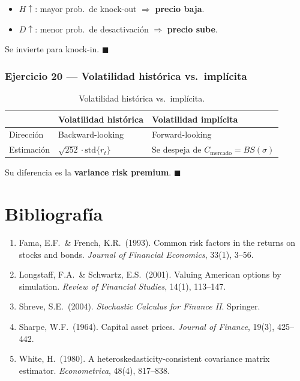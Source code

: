 \documentclass[12pt,letterpaper]{article}
\begin{document}
\begin{itemize}
  \item $H\uparrow$: mayor prob.\ de knock-out $\Rightarrow$ \textbf{precio baja}.
  \item $D\uparrow$: menor prob.\ de desactivaci\'on $\Rightarrow$ \textbf{precio sube}.
\end{itemize}
Se invierte para knock-in. $\blacksquare$

\section*{Ejercicio 20 --- Volatilidad hist\'orica vs.\ impl\'icita}

\begin{table}[h!]
\centering
\begin{tabular}{@{}lll@{}}
\toprule
 & Volatilidad hist\'orica & Volatilidad impl\'icita \\
\midrule
Direcci\'on  & Backward-looking & Forward-looking \\
Estimaci\'on & $\sqrt{252}\cdot\mathrm{std}\{r_t\}$
             & Se despeja de $C_{\text{mercado}} = BS(\sigma)$ \\
\bottomrule
\end{tabular}
\caption{Volatilidad hist\'orica vs.\ impl\'icita.}
\end{table}

Su diferencia es la \textbf{variance risk premium}. $\blacksquare$

\part*{Bibliograf\'ia}

\begin{enumerate}
  \item Fama, E.F.\ \& French, K.R.\ (1993). Common risk factors in the returns
    on stocks and bonds. \textit{Journal of Financial Economics}, 33(1), 3--56.
  \item Longstaff, F.A.\ \& Schwartz, E.S.\ (2001). Valuing American options by
    simulation. \textit{Review of Financial Studies}, 14(1), 113--147.
  \item Shreve, S.E.\ (2004). \textit{Stochastic Calculus for Finance II}.
    Springer.
  \item Sharpe, W.F.\ (1964). Capital asset prices. \textit{Journal of Finance},
    19(3), 425--442.
  \item White, H.\ (1980). A heteroskedasticity-consistent covariance matrix
    estimator. \textit{Econometrica}, 48(4), 817--838.
\end{enumerate}
\end{document}
